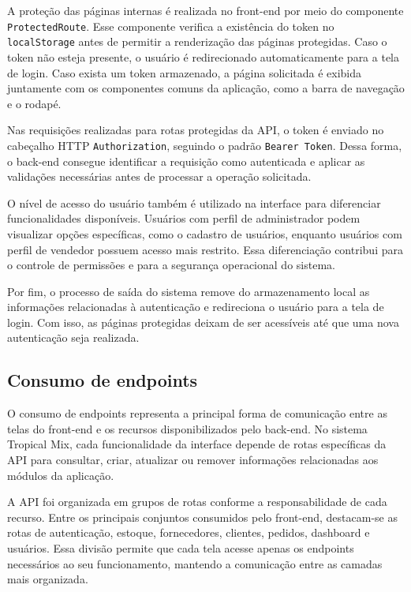 A proteção das páginas internas é realizada no front-end por meio do componente \texttt{ProtectedRoute}. Esse componente verifica a existência do token no \texttt{localStorage} antes de permitir a renderização das páginas protegidas. Caso o token não esteja presente, o usuário é redirecionado automaticamente para a tela de login. Caso exista um token armazenado, a página solicitada é exibida juntamente com os componentes comuns da aplicação, como a barra de navegação e o rodapé.

Nas requisições realizadas para rotas protegidas da API, o token é enviado no cabeçalho HTTP \texttt{Authorization}, seguindo o padrão \texttt{Bearer Token}. Dessa forma, o back-end consegue identificar a requisição como autenticada e aplicar as validações necessárias antes de processar a operação solicitada.

O nível de acesso do usuário também é utilizado na interface para diferenciar funcionalidades disponíveis. Usuários com perfil de administrador podem visualizar opções específicas, como o cadastro de usuários, enquanto usuários com perfil de vendedor possuem acesso mais restrito. Essa diferenciação contribui para o controle de permissões e para a segurança operacional do sistema.

Por fim, o processo de saída do sistema remove do armazenamento local as informações relacionadas à autenticação e redireciona o usuário para a tela de login. Com isso, as páginas protegidas deixam de ser acessíveis até que uma nova autenticação seja realizada.

\subsection{Consumo de endpoints}

O consumo de endpoints representa a principal forma de comunicação entre as telas do front-end e os recursos disponibilizados pelo back-end. No sistema Tropical Mix, cada funcionalidade da interface depende de rotas específicas da API para consultar, criar, atualizar ou remover informações relacionadas aos módulos da aplicação.

A API foi organizada em grupos de rotas conforme a responsabilidade de cada recurso. Entre os principais conjuntos consumidos pelo front-end, destacam-se as rotas de autenticação, estoque, fornecedores, clientes, pedidos, dashboard e usuários. Essa divisão permite que cada tela acesse apenas os endpoints necessários ao seu funcionamento, mantendo a comunicação entre as camadas mais organizada.


